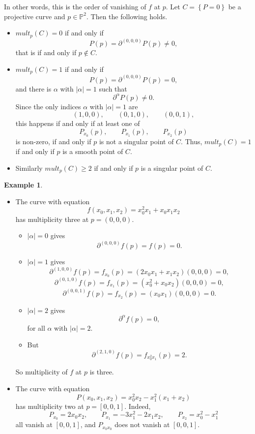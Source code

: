 \documentclass{article}
\renewcommand{\P}{\mathbb{P}}
\newcommand{\rb}[1]{\left( #1 \right)}
\renewcommand{\sb}[1]{\left[ #1 \right]}
\newcommand{\cb}[1]{\left\{ #1 \right\}}
\newcommand{\abs}[1]{\left\lvert #1 \right\rvert}
\theoremstyle{definition}\newtheorem{definition}{Definition}[section]
\theoremstyle{definition}\newtheorem{notation}[definition]{Notation}
\theoremstyle{definition}\newtheorem{remark}[definition]{Remark}
\theoremstyle{definition}\newtheorem{example1}[definition]{Example}
\theoremstyle{definition}\newtheorem{fact}{Fact}
\theoremstyle{definition}\newtheorem{exercise}{Exercise}
\theoremstyle{definition}\newtheorem*{example2}{Example}
\begin{document}
In other words, this is the order of vanishing of $ f $ at $ p $. Let $ C = \cb{P = 0} $ be a projective curve and $ p \in \P^2 $. Then the following holds.
\begin{itemize}
\item $ mult_p\rb{C} = 0 $ if and only if
$$ P\rb{p} = \partial^{\rb{0, 0, 0}} P\rb{p} \ne 0, $$
that is if and only if $ p \notin C $.
\item $ mult_p\rb{C} = 1 $ if and only if
$$ P\rb{p} = \partial^{\rb{0, 0, 0}} P\rb{p} = 0, $$
and there is $ \alpha $ with $ \abs{\alpha} = 1 $ such that
$$ \partial^{\alpha} P\rb{p} \ne 0. $$
Since the only indices $ \alpha $ with $ \abs{\alpha} = 1 $ are
$$ \rb{1, 0, 0}, \qquad \rb{0, 1, 0}, \qquad \rb{0, 0, 1}, $$
this happens if and only if at least one of
$$ P_{x_0}\rb{p}, \qquad P_{x_1}\rb{p}, \qquad P_{x_2}\rb{p} $$
is non-zero, if and only if $ p $ is not a singular point of $ C $. Thus, $ mult_p\rb{C} = 1 $ if and only if $ p $ is a smooth point of $ C $.
\item Similarly $ mult_p\rb{C} \ge 2 $ if and only if $ p $ is a singular point of $ C $.
\end{itemize}

\begin{example1}
\hfill
\begin{itemize}
\item The curve with equation
$$ f\rb{x_0, x_1, x_2} = x_0^2x_1 + x_0x_1x_2 $$
has multiplicity three at $ p = \rb{0, 0, 0} $.
\begin{itemize}
\item $ \abs{\alpha} = 0 $ gives
$$ \partial^{\rb{0, 0, 0}} f\rb{p} = f\rb{p} = 0. $$
\item $ \abs{\alpha} = 1 $ gives
$$ \partial^{\rb{1, 0, 0}} f\rb{p} = f_{x_0}\rb{p} = \rb{2x_0x_1 + x_1x_2}\rb{0, 0, 0} = 0, $$
$$ \partial^{\rb{0, 1, 0}} f\rb{p} = f_{x_1}\rb{p} = \rb{x_0^2 + x_0x_2}\rb{0, 0, 0} = 0, $$
$$ \partial^{\rb{0, 0, 1}} f\rb{p} = f_{x_2}\rb{p} = \rb{x_0x_1}\rb{0, 0, 0} = 0. $$
\item $ \abs{\alpha} = 2 $ gives
$$ \partial^\alpha f\rb{p} = 0, $$
for all $ \alpha $ with $ \abs{\alpha} = 2 $.
\item But
$$ \partial^{\rb{2, 1, 0}} f\rb{p} = f_{x_0^2x_1}\rb{p} = 2. $$
\end{itemize}
So multiplicity of $ f $ at $ p $ is three.
\item The curve with equation
$$ P\rb{x_0, x_1, x_2} = x_0^2x_2 - x_1^2\rb{x_1 + x_2} $$
has multiplicity two at $ p = \sb{0, 0, 1} $. Indeed,
$$ P_{x_0} = 2x_0x_2, \qquad P_{x_1} = -3x_1^2 - 2x_1x_2, \qquad P_{x_2} = x_0^2 - x_1^2 $$
all vanish at $ \sb{0, 0, 1} $, and $ P_{x_0x_0} $ does not vanish at $ \sb{0, 0, 1} $.
\end{itemize}
\end{example1}
\end{document}
